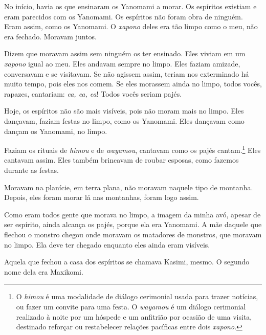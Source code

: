 No início, havia os que ensinaram os Yanomami a morar. Os espíritos
existiam e eram parecidos com os Yanomami. Os espíritos não foram obra
de ninguém. Eram assim, como os Yanomami. O \textit{xapono} deles era tão limpo
como o meu, não era fechado. Moravam juntos. 

Dizem que moravam assim sem ninguém os ter ensinado. Eles viviam em um \textit{xapono}
igual ao meu. Eles andavam sempre no limpo. Eles faziam amizade,
conversavam e se visitavam. Se não agissem assim, teriam nos exterminado
há muito tempo, pois eles nos comem. Se eles morassem ainda no limpo,
todos vocês, rapazes, cantariam: \textit{ea, ea, ea}! Todos vocês seriam
pajés. 

Hoje, os espíritos não são mais visíveis, pois não moram mais no limpo.
Eles dançavam, faziam festas no limpo, como os Yanomami. Eles dançavam
como dançam os Yanomami, no limpo. 

Faziam os rituais de \textit{himou} e de \textit{wayamou}, cantavam como os
pajés cantam.\footnote{O \textit{himou} é uma modalidade de diálogo cerimonial usada para trazer notícias, ou fazer um convite para uma festa. O \textit{wayamou} é um diálogo cerimonial realizado à noite por um hóspede e um anfitrião por ocasião de uma visita, destinado reforçar ou restabelecer relações pacíficas entre dois \textit{xapono}.} Eles cantavam assim. Eles também brincavam de roubar
esposas, como fazemos durante as festas. 

Moravam na planície, em terra plana, não moravam naquele tipo de
montanha. Depois, eles foram morar lá nas montanhas, foram logo assim. 

Como eram todos gente que morava no limpo, a imagem da minha avó, apesar
de ser espírito, ainda alcança os pajés, porque ela era Yanomami. A mãe
daquele que flechou o monstro chegou onde moravam os matadores de
monstros, que moravam no limpo. Ela deve ter chegado enquanto eles ainda
eram visíveis. 

Aquela que fechou a casa dos espíritos se chamava Kasimi, mesmo. O segundo nome dela era Maxikomi. 



